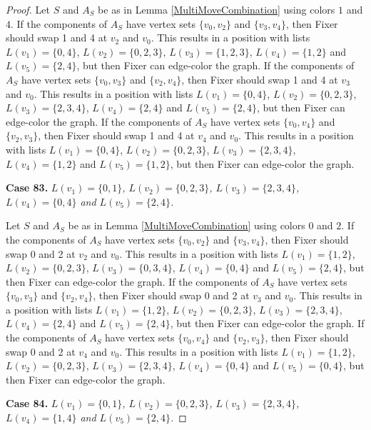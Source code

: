 \documentclass[12pt]{amsart}
\theoremstyle{plain}
\theoremstyle{definition}
\theoremstyle{remark}
\begin{document}
\begin{proof}
Let $S$ and $A_S$ be as in Lemma \ref{MultiMoveCombination} using colors $1$ and $4$. If the components of $A_S$ have vertex sets $\{v_0, v_2\}$ and $\{v_3, v_4\}$, then Fixer should swap 1 and 4 at $v_2$ and $v_0$. This results in a position with lists $L(v_1) = \{0, 4\}$, $L(v_2) = \{0, 2, 3\}$, $L(v_3) = \{1, 2, 3\}$, $L(v_4) = \{1, 2\}$ and $L(v_5) = \{2, 4\}$, but then Fixer can edge-color the graph.
If the components of $A_S$ have vertex sets $\{v_0, v_3\}$ and $\{v_2, v_4\}$, then Fixer should swap 1 and 4 at $v_3$ and $v_0$. This results in a position with lists $L(v_1) = \{0, 4\}$, $L(v_2) = \{0, 2, 3\}$, $L(v_3) = \{2, 3, 4\}$, $L(v_4) = \{2, 4\}$ and $L(v_5) = \{2, 4\}$, but then Fixer can edge-color the graph.
If the components of $A_S$ have vertex sets $\{v_0, v_4\}$ and $\{v_2, v_3\}$, then Fixer should swap 1 and 4 at $v_4$ and $v_0$. This results in a position with lists $L(v_1) = \{0, 4\}$, $L(v_2) = \{0, 2, 3\}$, $L(v_3) = \{2, 3, 4\}$, $L(v_4) = \{1, 2\}$ and $L(v_5) = \{1, 2\}$, but then Fixer can edge-color the graph.

\noindent\textbf{Case 83.  }\textit{$L(v_1) = \{0, 1\}$, $L(v_2) = \{0, 2, 3\}$, $L(v_3) = \{2, 3, 4\}$, $L(v_4) = \{0, 4\}$ and $L(v_5) = \{2, 4\}$.}

Let $S$ and $A_S$ be as in Lemma \ref{MultiMoveCombination} using colors $0$ and $2$. If the components of $A_S$ have vertex sets $\{v_0, v_2\}$ and $\{v_3, v_4\}$, then Fixer should swap 0 and 2 at $v_2$ and $v_0$. This results in a position with lists $L(v_1) = \{1, 2\}$, $L(v_2) = \{0, 2, 3\}$, $L(v_3) = \{0, 3, 4\}$, $L(v_4) = \{0, 4\}$ and $L(v_5) = \{2, 4\}$, but then Fixer can edge-color the graph.
If the components of $A_S$ have vertex sets $\{v_0, v_3\}$ and $\{v_2, v_4\}$, then Fixer should swap 0 and 2 at $v_3$ and $v_0$. This results in a position with lists $L(v_1) = \{1, 2\}$, $L(v_2) = \{0, 2, 3\}$, $L(v_3) = \{2, 3, 4\}$, $L(v_4) = \{2, 4\}$ and $L(v_5) = \{2, 4\}$, but then Fixer can edge-color the graph.
If the components of $A_S$ have vertex sets $\{v_0, v_4\}$ and $\{v_2, v_3\}$, then Fixer should swap 0 and 2 at $v_4$ and $v_0$. This results in a position with lists $L(v_1) = \{1, 2\}$, $L(v_2) = \{0, 2, 3\}$, $L(v_3) = \{2, 3, 4\}$, $L(v_4) = \{0, 4\}$ and $L(v_5) = \{0, 4\}$, but then Fixer can edge-color the graph.

\noindent\textbf{Case 84.  }\textit{$L(v_1) = \{0, 1\}$, $L(v_2) = \{0, 2, 3\}$, $L(v_3) = \{2, 3, 4\}$, $L(v_4) = \{1, 4\}$ and $L(v_5) = \{2, 4\}$.}


\end{proof}
\end{document}
